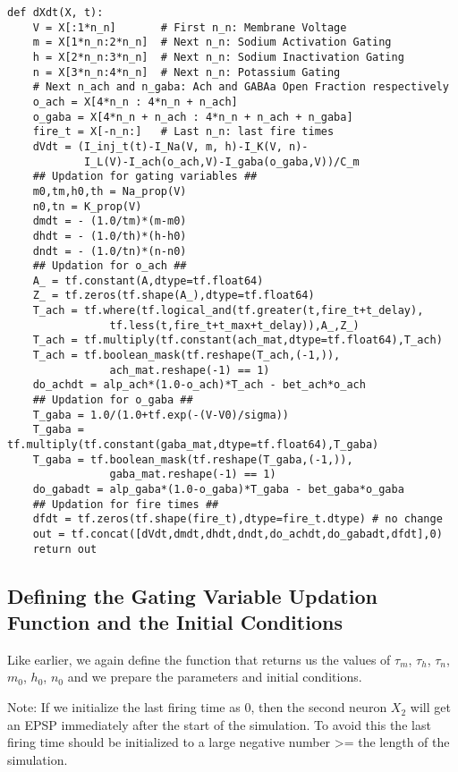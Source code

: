 \documentclass[10pt,letterpaper]{article}
\begin{document}
\begin{verbatim}
def dXdt(X, t):
    V = X[:1*n_n]       # First n_n: Membrane Voltage
    m = X[1*n_n:2*n_n]  # Next n_n: Sodium Activation Gating
    h = X[2*n_n:3*n_n]  # Next n_n: Sodium Inactivation Gating
    n = X[3*n_n:4*n_n]  # Next n_n: Potassium Gating
    # Next n_ach and n_gaba: Ach and GABAa Open Fraction respectively
    o_ach = X[4*n_n : 4*n_n + n_ach]
    o_gaba = X[4*n_n + n_ach : 4*n_n + n_ach + n_gaba] 
    fire_t = X[-n_n:]   # Last n_n: last fire times
    dVdt = (I_inj_t(t)-I_Na(V, m, h)-I_K(V, n)-
    		I_L(V)-I_ach(o_ach,V)-I_gaba(o_gaba,V))/C_m 
    ## Updation for gating variables ##
    m0,tm,h0,th = Na_prop(V)
    n0,tn = K_prop(V)
    dmdt = - (1.0/tm)*(m-m0)
    dhdt = - (1.0/th)*(h-h0)
    dndt = - (1.0/tn)*(n-n0)
    ## Updation for o_ach ##
    A_ = tf.constant(A,dtype=tf.float64)
    Z_ = tf.zeros(tf.shape(A_),dtype=tf.float64)
    T_ach = tf.where(tf.logical_and(tf.greater(t,fire_t+t_delay),
    			tf.less(t,fire_t+t_max+t_delay)),A_,Z_) 
    T_ach = tf.multiply(tf.constant(ach_mat,dtype=tf.float64),T_ach)
    T_ach = tf.boolean_mask(tf.reshape(T_ach,(-1,)),
    			ach_mat.reshape(-1) == 1)
    do_achdt = alp_ach*(1.0-o_ach)*T_ach - bet_ach*o_ach
    ## Updation for o_gaba ##
    T_gaba = 1.0/(1.0+tf.exp(-(V-V0)/sigma))
    T_gaba = tf.multiply(tf.constant(gaba_mat,dtype=tf.float64),T_gaba)
    T_gaba = tf.boolean_mask(tf.reshape(T_gaba,(-1,)),
    			gaba_mat.reshape(-1) == 1)
    do_gabadt = alp_gaba*(1.0-o_gaba)*T_gaba - bet_gaba*o_gaba
    ## Updation for fire times ##
    dfdt = tf.zeros(tf.shape(fire_t),dtype=fire_t.dtype) # no change
    out = tf.concat([dVdt,dmdt,dhdt,dndt,do_achdt,do_gabadt,dfdt],0)
    return out
\end{verbatim}

\subsection*{Defining the Gating Variable Updation Function and the Initial Conditions}

Like earlier, we again define the function that returns us the values of $\tau_m$, $\tau_h$, $\tau_n$, $m_0$, $h_0$, $n_0$ and we prepare the parameters and initial conditions. 

Note: If we initialize the last firing time as 0, then the second neuron $X_2$ will get an EPSP immediately after the start of the simulation. To avoid this the last firing time should be initialized to a large negative number >= the length of the simulation.
\end{document}
